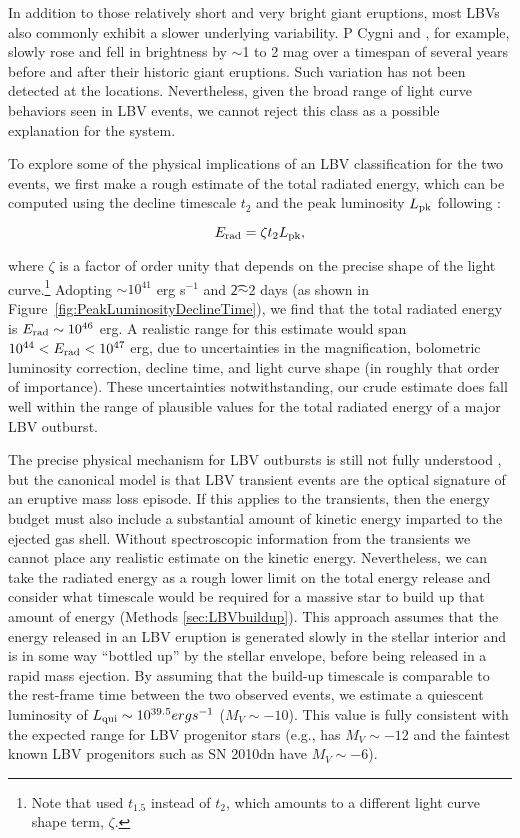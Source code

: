 In addition to those relatively short and very bright giant eruptions,
most LBVs also commonly exhibit a slower underlying variability. P
Cygni and \etaCar, for example, slowly rose and fell in brightness by
$\sim$1 to 2 mag over a timespan of several years before and after
their historic giant eruptions.  Such variation has not been detected
at the \spock locations. Nevertheless, given the broad
range of light curve behaviors seen in LBV events, we cannot reject
this class as a possible explanation for the \spock system.

To explore some of the physical implications of an LBV
classification for the two \spock events, we first make a rough
estimate of the total radiated energy, which can be computed using the
decline timescale $t_2$ and the peak luminosity $L_{\rm pk}$ following
\citet{Smith:2011b}:

\begin{equation}
  \label{eqn:Erad}
  E_{\rm rad} = \zeta \t2 \Lpk,
\end{equation}

\noindent where $\zeta$ is a factor of order unity that depends on the
precise shape of the light curve.\footnote{Note that
  \citet{Smith:2011b} used $t_{1.5}$ instead of $t_2$, which amounts
  to a different light curve shape term, $\zeta$.}  Adopting
\Lpk$\sim10^{41}$ erg s$^{-1}$ and \t2$\sim$2 days (as shown in
Figure~\ref{fig:PeakLuminosityDeclineTime}), we find that the total
radiated energy is $E_{\rm rad}\sim10^{46}$ erg.  A realistic range
for this estimate would span $10^{44}<E_{\rm rad}<10^{47}$ erg, due to
uncertainties in the magnification, bolometric luminosity correction,
decline time, and light curve shape (in roughly that order of
importance). These uncertainties notwithstanding, our crude estimate
does fall well within the range of plausible values for the total
radiated energy of a major LBV outburst.

The precise physical mechanism for LBV outbursts is still not fully
understood \citep[e.g.][]{Smith:2006,Woosley:2007,Dessart:2010}, but
the canonical model is that LBV transient events are the optical
signature of an eruptive mass loss episode.  If this applies to the
\spock transients, then the energy budget must also include a
substantial amount of kinetic energy imparted to the ejected gas
shell. Without spectroscopic information from the \spock transients we
cannot place any realistic estimate on the kinetic
energy. Nevertheless, we can take the radiated energy as a rough lower
limit on the total energy release and consider what timescale would be
required for a massive star to build up that amount of energy (Methods
\ref{sec:LBVbuildup}). This approach assumes that the energy released
in an LBV eruption is generated slowly in the stellar interior and is
in some way ``bottled up'' by the stellar envelope, before being
released in a rapid mass ejection.  By assuming that the build-up
timescale is comparable to the rest-frame time between the two
observed events, we estimate a quiescent luminosity of $L_{\rm
  qui}\sim10^{39.5} erg s^{-1}$ ($M_V\sim-10$).  This value is fully
consistent with the expected range for LBV progenitor stars (e.g.,
\etacar has $M_V\sim-12$ and the faintest known LBV progenitors such
as SN 2010dn have $M_V\sim-6$).


